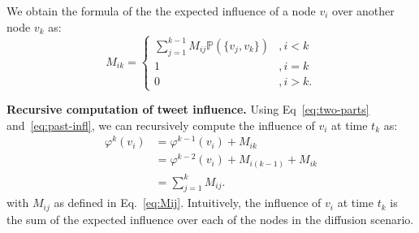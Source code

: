 We obtain the formula of the the expected influence of a node $v_i$ over another node $v_k$ as:
%
\begin{equation} \label{eq:Mij}
M_{ik}=
\left\{
\begin{array}{ll}
	\sum^{k-1}_{j=1}M_{ij}\mathds{P}(\{v_j, v_k\}) &,i < k \\
	1 & ,i = k \\
	0 & ,i > k.
\end{array}
\right.
\end{equation} 

\textbf{Recursive computation of tweet influence.}
Using Eq~\eqref{eq:two-parts} and~\eqref{eq:past-infl}, we can recursively compute the influence of $v_i$ at time $t_k$ as:
\begin{align}
	\varphi^k(v_i) &= \varphi^{k-1}(v_i) + M_{ik} \nonumber \\
				   &= \varphi^{k-2}(v_i) + M_{i(k-1)} + M_{ik} \nonumber \\
				   &= \sum_{j=1}^k M_{ij}. 
\end{align}
with $M_{ij}$ as defined in Eq.~\eqref{eq:Mij}.
Intuitively, the influence of $v_i$ at time $t_k$ is the sum of the expected influence over each of the nodes in the diffusion scenario.


